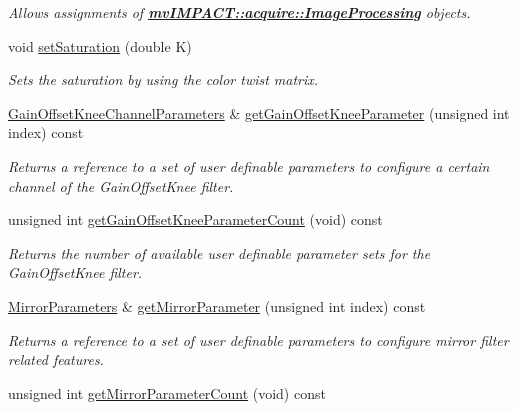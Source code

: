 \begin{DoxyCompactItemize}
\begin{DoxyCompactList}\small\item\em Allows assignments of {\bfseries \hyperlink{classmv_i_m_p_a_c_t_1_1acquire_1_1_image_processing}{mv\+I\+M\+P\+A\+C\+T\+::acquire\+::\+Image\+Processing}} objects. \end{DoxyCompactList}\item 
void \hyperlink{classmv_i_m_p_a_c_t_1_1acquire_1_1_image_processing_aaaba17f2f9aadb9a1e93f3e21a3536fc}{set\+Saturation} (double K)
\begin{DoxyCompactList}\small\item\em Sets the saturation by using the color twist matrix. \end{DoxyCompactList}\item 
\hyperlink{classmv_i_m_p_a_c_t_1_1acquire_1_1_gain_offset_knee_channel_parameters}{Gain\+Offset\+Knee\+Channel\+Parameters} \& \hyperlink{classmv_i_m_p_a_c_t_1_1acquire_1_1_image_processing_a93e811b5063a027b43599643abc3f132}{get\+Gain\+Offset\+Knee\+Parameter} (unsigned int index) const 
\begin{DoxyCompactList}\small\item\em Returns a reference to a set of user definable parameters to configure a certain channel of the Gain\+Offset\+Knee filter. \end{DoxyCompactList}\item 
\hypertarget{classmv_i_m_p_a_c_t_1_1acquire_1_1_image_processing_ab288b4ffa5cb84731471181b26eab240}{unsigned int \hyperlink{classmv_i_m_p_a_c_t_1_1acquire_1_1_image_processing_ab288b4ffa5cb84731471181b26eab240}{get\+Gain\+Offset\+Knee\+Parameter\+Count} (void) const }\label{classmv_i_m_p_a_c_t_1_1acquire_1_1_image_processing_ab288b4ffa5cb84731471181b26eab240}

\begin{DoxyCompactList}\small\item\em Returns the number of available user definable parameter sets for the Gain\+Offset\+Knee filter. \end{DoxyCompactList}\item 
\hyperlink{classmv_i_m_p_a_c_t_1_1acquire_1_1_mirror_parameters}{Mirror\+Parameters} \& \hyperlink{classmv_i_m_p_a_c_t_1_1acquire_1_1_image_processing_aa77f9e7eea7274c5cc1259c59a6f6b1f}{get\+Mirror\+Parameter} (unsigned int index) const 
\begin{DoxyCompactList}\small\item\em Returns a reference to a set of user definable parameters to configure mirror filter related features. \end{DoxyCompactList}\item 
\hypertarget{classmv_i_m_p_a_c_t_1_1acquire_1_1_image_processing_a84acdd3171cf4d638105ffd982c68f7f}{unsigned int \hyperlink{classmv_i_m_p_a_c_t_1_1acquire_1_1_image_processing_a84acdd3171cf4d638105ffd982c68f7f}{get\+Mirror\+Parameter\+Count} (void) const }\label{classmv_i_m_p_a_c_t_1_1acquire_1_1_image_processing_a84acdd3171cf4d638105ffd982c68f7f}


\end{DoxyCompactItemize}
